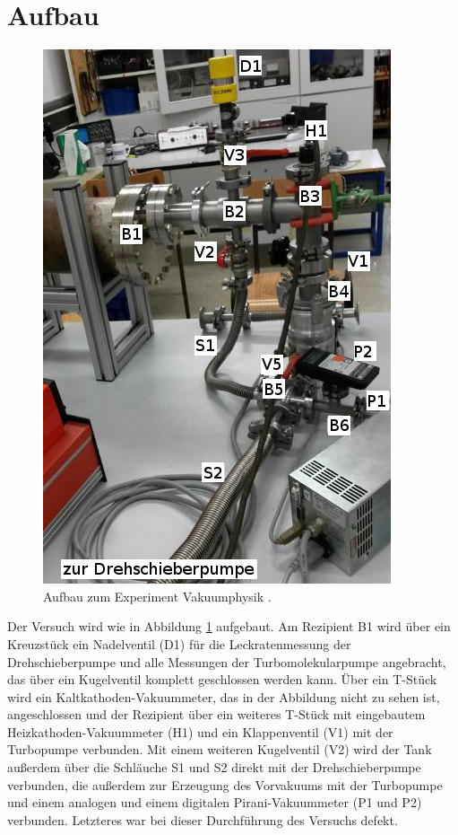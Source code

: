 
\section{Aufbau}
\label{sec:Aufbau}

\begin{figure}
\vspace{-0.5cm}
\includegraphics[scale=0.5]{content/images/Aufbau2.jpg}
\caption{Aufbau zum Experiment Vakuumphysik \cite{V70}.}
\label{fig:Aufbau}
\end{figure}

Der Versuch wird wie in Abbildung \ref{fig:Aufbau} aufgebaut. Am Rezipient B1 wird über ein Kreuzstück ein Nadelventil (D1) für die Leckratenmessung der Drehschieberpumpe und alle Messungen der Turbomolekularpumpe angebracht, das über ein Kugelventil komplett geschlossen werden kann. Über ein T-Stück wird ein Kaltkathoden-Vakuummeter, das in der Abbildung nicht zu sehen ist, angeschlossen und der Rezipient über ein weiteres T-Stück mit eingebautem Heizkathoden-Vakuummeter (H1) und ein Klappenventil (V1) mit der Turbopumpe verbunden. Mit einem weiteren Kugelventil (V2) wird der Tank außerdem über die Schläuche S1 und S2 direkt mit der Drehschieberpumpe verbunden, die außerdem zur Erzeugung des Vorvakuums mit der Turbopumpe und einem analogen und einem digitalen Pirani-Vakuummeter (P1 und P2) verbunden. Letzteres war bei dieser Durchführung des Versuchs defekt.